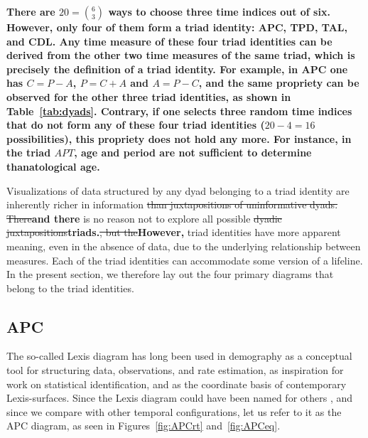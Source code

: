 \documentclass[12pt,oneside,letter]{article} %
\newcommand\tgh[1]{\raisebox{-.25\height}{\texttt{[image: Figures/triadtable/triad\#1.pdf]}}}
\begin{document}
\textbf{There are $20=\binom{6}{3}$ ways to choose three time indices out of six. However, only four of them form a triad identity: APC, TPD, TAL, and CDL. Any time measure of these four triad identities can be derived from the other two time measures of the same triad, which is precisely the definition of a triad identity. For example, in APC one has $C=P-A$, $P=C+A$ and $A=P-C$, and the same propriety can be observed for the other three triad identities, as shown in Table~\ref{tab:dyads}. Contrary, if one selects three random time indices that do not form any of these four triad identities ($20-4=16$ possibilities), this propriety does not hold any more. For instance, in the triad $APT$, age and period are not sufficient to determine thanatological age.}

Visualizations of data structured by any dyad belonging to a triad identity
are inherently richer in information \sout{than juxtapositions of uninformative dyads. There}\textbf{and there} is no reason not
to explore all possible \sout{dyadic juxtapositions}\textbf{triads.}\sout{, but the}\textbf{However,} triad identities have more
apparent meaning, even in the absence of data, due to the underlying
relationship between measures. Each of the triad identities can accommodate some
version of a lifeline. In the present section, we therefore lay out
the four primary diagrams that belong to the triad identities. 

\FloatBarrier
\subsection*{APC}%
\FloatBarrier
The so-called Lexis diagram has long been used in demography as a conceptual
tool for structuring data, observations, and rate estimation, as inspiration for work
on statistical identification, and as the coordinate basis of contemporary
Lexis-surfaces.
Since the Lexis diagram could have been named for others
\citep{vandeschrick2001lexis,keiding2011age}, and since we compare with other
temporal configurations, let us refer to it as the APC diagram, as seen in
Figures~\ref{fig:APCrt} and~\ref{fig:APCeq}. 
\end{document}
